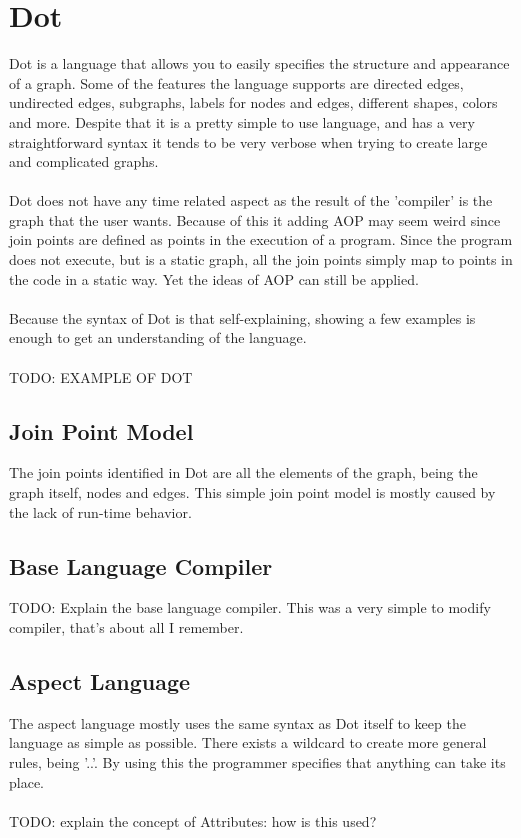 \documentclass[a4paper]{report}
\begin{document}
\chapter{Dot}
Dot is a language that allows you to easily specifies the structure and appearance of a graph. Some of the features the language supports  are directed edges, undirected edges, subgraphs, labels for nodes and edges, different shapes, colors and more. Despite that it is a pretty simple to use language, and has a very straightforward syntax it tends to be very verbose when trying to create large and complicated graphs.\\
\\
Dot does not have any time related aspect as the result of the 'compiler' is the graph that the user wants. Because of this it adding AOP may seem weird since join points are defined as points in the execution of a program. Since the program does not execute, but is a static graph, all the join points simply map to points in the code in a static way. Yet the ideas of AOP can still be applied.\\
\\
Because the syntax of Dot is that self-explaining, showing a few examples is enough to get an understanding of the language.\\
\\
TODO: EXAMPLE OF DOT

\section{Join Point Model}
The join points identified in Dot are all the elements of the graph, being the graph itself, nodes and edges. This simple join point model is mostly caused by the lack of run-time behavior.

\section{Base Language Compiler}
TODO: Explain the base language compiler. This was a very simple to modify compiler, that's about all I remember.

\section{Aspect Language}
The aspect language mostly uses the same syntax as Dot itself to keep the language as simple as possible. There exists a wildcard to create more general rules, being '..'. By using this the programmer specifies that anything can take its place.\\
\\
TODO: explain the concept of Attributes: how is this used?
\end{document}
